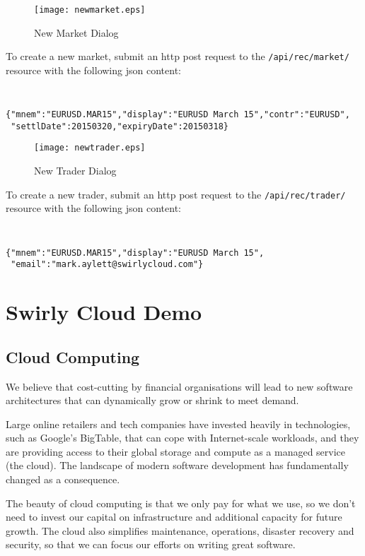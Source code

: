 \documentclass[11pt,a4paper]{article}
\begin{document}
\begin{figure}[H]
\centering
\texttt{[image: newmarket.eps]}
\caption{New Market Dialog}
\end{figure}

To create a new \gls{market}, submit an \gls{http} post request to the \texttt{/api/rec/market/}
resource with the following \gls{json} content:

{\tt\small
\begin{verbatim}
{"mnem":"EURUSD.MAR15","display":"EURUSD March 15","contr":"EURUSD",
 "settlDate":20150320,"expiryDate":20150318}
\end{verbatim}
}

\begin{figure}[H]
\centering
\texttt{[image: newtrader.eps]}
\caption{New Trader Dialog}
\end{figure}

To create a new trader, submit an \gls{http} post request to the \texttt{/api/rec/trader/} resource
with the following \gls{json} content:

{\tt\small
\begin{verbatim}
{"mnem":"EURUSD.MAR15","display":"EURUSD March 15",
 "email":"mark.aylett@swirlycloud.com"}
\end{verbatim}
}

\section{Swirly Cloud Demo}

\subsection{Cloud Computing}

We believe that cost-cutting by financial organisations will lead to new software architectures that
can dynamically grow or shrink to meet demand.

Large online retailers and tech companies have invested heavily in technologies, such as
Google's\cite{google} BigTable\cite{bigtable}, that can cope with Internet-scale workloads, and they
are providing access to their global storage and compute as a managed service (the \gls{cloud}). The
landscape of modern software development has fundamentally changed as a consequence.

The beauty of \gls{cloud} computing is that we only pay for what we use, so we don't need to invest
our capital on infrastructure and additional capacity for future growth. The \gls{cloud} also
simplifies maintenance, operations, disaster recovery and security, so that we can focus our efforts
on writing great software.
\end{document}
